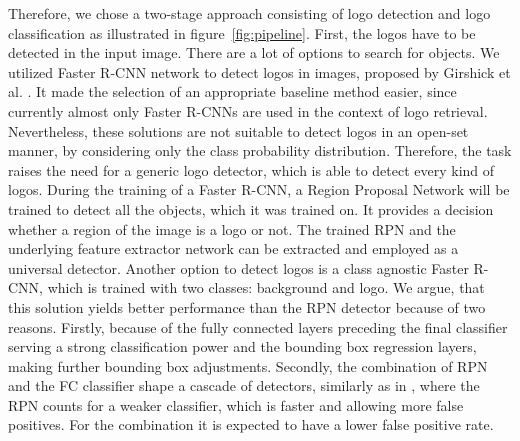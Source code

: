 \documentclass[a4paper,twoside]{article}
\begin{document}
Therefore, we chose a two-stage approach consisting of logo detection and logo classification as illustrated in figure~\ref{fig:pipeline}. First, the logos have to be detected in the input image. 
There are a lot of options to search for objects. We utilized Faster R-CNN network to detect logos in images, proposed by Girshick et al. \cite{ren2015}. It made the selection of an appropriate baseline method easier, since currently almost only Faster R-CNNs are used in the context of logo retrieval. Nevertheless, these solutions are not suitable to detect logos in an open-set manner, by considering only the class probability distribution. Therefore, the task raises the need for a generic logo detector, which is able to detect every kind of logos.
During the training of a Faster R-CNN, a Region Proposal Network will be trained to detect all the objects, which it was trained on. It provides a decision whether a region of the image is a logo or not. The trained RPN and the underlying feature extractor network can be extracted and employed as a universal detector. 
Another option to detect logos is a class agnostic Faster R-CNN, which is trained with two classes: background and logo. We argue, that this solution yields better performance than the RPN detector because of two reasons. Firstly, because of the fully connected layers preceding the final classifier serving a strong classification power and the bounding box regression layers, making further bounding box adjustments. Secondly, the combination of RPN and the FC classifier shape a cascade of detectors, similarly as in \cite{viola2004}, where the RPN counts for a weaker classifier, which is faster and allowing more false positives. For the combination it is expected to have a lower false positive rate.

\end{document}
